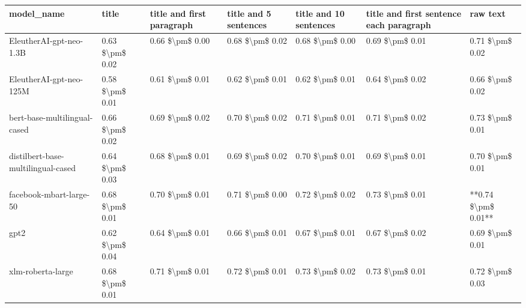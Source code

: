 \begin{tabular}{lllllll}
\toprule
                        model\_name &           title & title and first paragraph & title and 5 sentences & title and 10 sentences & title and first sentence each paragraph &            raw text \\
\midrule
           EleutherAI-gpt-neo-1.3B & 0.63 \$\textbackslash pm\$ 0.02 &           0.66 \$\textbackslash pm\$ 0.00 &       0.68 \$\textbackslash pm\$ 0.02 &        0.68 \$\textbackslash pm\$ 0.00 &                         0.69 \$\textbackslash pm\$ 0.01 &     0.71 \$\textbackslash pm\$ 0.02 \\
           EleutherAI-gpt-neo-125M & 0.58 \$\textbackslash pm\$ 0.01 &           0.61 \$\textbackslash pm\$ 0.01 &       0.62 \$\textbackslash pm\$ 0.01 &        0.62 \$\textbackslash pm\$ 0.01 &                         0.64 \$\textbackslash pm\$ 0.02 &     0.66 \$\textbackslash pm\$ 0.02 \\
      bert-base-multilingual-cased & 0.66 \$\textbackslash pm\$ 0.02 &           0.69 \$\textbackslash pm\$ 0.02 &       0.70 \$\textbackslash pm\$ 0.02 &        0.71 \$\textbackslash pm\$ 0.01 &                         0.71 \$\textbackslash pm\$ 0.02 &     0.73 \$\textbackslash pm\$ 0.01 \\
distilbert-base-multilingual-cased & 0.64 \$\textbackslash pm\$ 0.03 &           0.68 \$\textbackslash pm\$ 0.01 &       0.69 \$\textbackslash pm\$ 0.02 &        0.70 \$\textbackslash pm\$ 0.01 &                         0.69 \$\textbackslash pm\$ 0.01 &     0.70 \$\textbackslash pm\$ 0.01 \\
           facebook-mbart-large-50 & 0.68 \$\textbackslash pm\$ 0.01 &           0.70 \$\textbackslash pm\$ 0.01 &       0.71 \$\textbackslash pm\$ 0.00 &        0.72 \$\textbackslash pm\$ 0.02 &                         0.73 \$\textbackslash pm\$ 0.01 & **0.74 \$\textbackslash pm\$ 0.01** \\
                              gpt2 & 0.62 \$\textbackslash pm\$ 0.04 &           0.64 \$\textbackslash pm\$ 0.01 &       0.66 \$\textbackslash pm\$ 0.01 &        0.67 \$\textbackslash pm\$ 0.01 &                         0.67 \$\textbackslash pm\$ 0.02 &     0.69 \$\textbackslash pm\$ 0.01 \\
                 xlm-roberta-large & 0.68 \$\textbackslash pm\$ 0.01 &           0.71 \$\textbackslash pm\$ 0.01 &       0.72 \$\textbackslash pm\$ 0.01 &        0.73 \$\textbackslash pm\$ 0.02 &                         0.73 \$\textbackslash pm\$ 0.01 &     0.72 \$\textbackslash pm\$ 0.03 \\
\bottomrule
\end{tabular}
